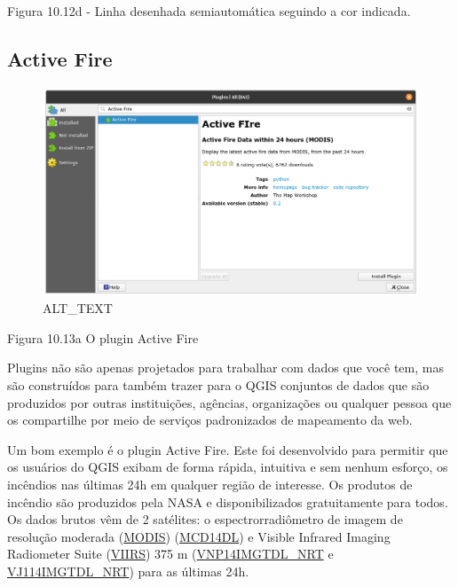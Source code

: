 \documentclass[
  portuguese,
]{krantz}
\begin{document}
Figura 10.12d - Linha desenhada semiautomática seguindo a cor indicada.

\hypertarget{active-fire}{%
\subsection{\texorpdfstring{\textbf{Active Fire}}{Active Fire}}\label{active-fire}}

\begin{figure}
\centering
\includegraphics{media/modulo10/fig1013_a.png}
\caption{ALT\_TEXT}
\end{figure}

Figura 10.13a O plugin Active Fire

Plugins não são apenas projetados para trabalhar com dados que você tem, mas são construídos para também trazer para o QGIS conjuntos de dados que são produzidos por outras instituições, agências, organizações ou qualquer pessoa que os compartilhe por meio de serviços padronizados de mapeamento da web.

Um bom exemplo é o plugin Active Fire. Este foi desenvolvido para permitir que os usuários do QGIS exibam de forma rápida, intuitiva e sem nenhum esforço, os incêndios nas últimas 24h em qualquer região de interesse. Os produtos de incêndio são produzidos pela NASA e disponibilizados gratuitamente para todos. Os dados brutos vêm de 2 satélites: o espectrorradiômetro de imagem de resolução moderada (\href{https://modis.gsfc.nasa.gov/}{MODIS}) (\href{https://earthdata.nasa.gov/earth-observation-data/near-real-time/firm/c6-mcd14dl}{MCD14DL}) e Visible Infrared Imaging Radiometer Suite (\href{https://www.jpss.noaa.gov/viirs.html}{VIIRS}) 375 m (\href{https://earthdata.nasa.gov/earth-observation-data/near-real-time/firms/v1-vnp14imgt}{VNP14IMGTDL\_NRT} e \href{https://earthdata.nasa.gov/earth-observation-data/near-real-time/firms/vj114imgtdl-nrt}{VJ114IMGTDL\_NRT}) para as últimas 24h.
\end{document}
